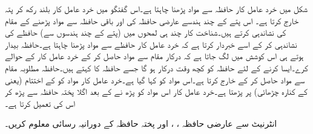 شکل    میں خرد عامل کار حافظہ سے مواد پڑھنا چاہتا ہے۔اس گفتگو میں خرد عامل کار  بلند رکھ کر پتہ خارج کرتا ہے۔ اس  پتے کے چند ہندسے عارضی حافظہ کی اور باقی حافظہ سے مواد پڑھنے کے مقام کی نشاندہی کرتے ہیں۔شناخت کار چند ہی لمحوں میں (پتے کے چند ہندسوں سے) حافظے کی نشاندہی کر کے اسے خبردار کرتا ہے کہ خرد عامل کار حافظے سے مواد پڑھنا چاہتا ہے۔حافظہ بیدار ہوتے ہی اس کوشش میں لگ جاتا ہے کہ درکار مقام سے مواد حاصل کر کے خرد عامل کار کے حوالے کرے۔ایسا کرنے کے لئے حافظہ کو کچھ وقت درکار ہو گا جسے حافظہ کا  کہتے ہیں۔حافظہ مطلوبہ مقام سے مواد حاصل کر کے خارج کرتا ہے۔اس مواد کو  کہا گیا ہے۔خرد عامل کار مواد کو  کے اختتام  (یعنی  کے کنارہ چڑھائی)     پر پڑھتا ہے۔خرد عامل کار اس مواد کو پڑھ نے کے بعد  اگلا   پختہ حافظہ سے پڑھ کر   اس کی تعمیل کرتا ہے۔

انٹرنیٹ سے عارضی حافظہ  ، ،  اور پختہ حافظہ    کے دورانیہ رسائی معلوم  کریں۔

